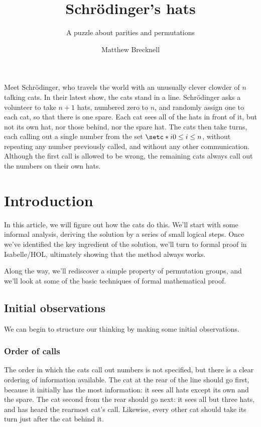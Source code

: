 \documentclass[10pt,a4paper]{scrartcl}
\title{Schr\"odinger's hats}
\subtitle{A puzzle about parities and permutations}
\author{Matthew Brecknell}
\begin{document}
\maketitle

Meet Schr\"odinger, who travels the world with an unusually clever clowder of
$n$ talking cats. In their latest show, the cats stand in a line.
Schr\"odinger asks a volunteer to take $n+1$ hats, numbered zero to $n$, and
randomly assign one to each cat, so that there is one spare. Each cat sees all
of the hats in front of it, but not its own hat, nor those behind, nor the
spare hat. The cats then take turns, each calling out a single number from the
set $\setc*{i}{0 \leq i \leq n}$, without repeating any number previously
called, and without any other communication. Although the first call is allowed
to be wrong, the remaining cats always call out the numbers on their own hats.

\section{Introduction}

In this article, we will figure out how the cats do this. We'll start with some
informal analysis, deriving the solution by a series of small logical steps.
Once we've identified the key ingredient of the solution, we'll turn to formal
proof in Isabelle/HOL, ultimately showing that the method always works.

Along the way, we'll rediscover a simple property of permutation groups, and
we'll look at some of the basic techniques of formal mathematical proof.

\subsection{Initial observations}

We can begin to structure our thinking by making some initial observations.

\subsubsection{Order of calls}

The order in which the cats call out numbers is not specified, but there is a
clear ordering of information available. The cat at the rear of the line should
go first, because it initially has the most information: it sees all hats
except its own and the spare. The cat second from the rear should go next: it
sees all but three hats, and has heard the rearmost cat's call. Likewise, every
other cat should take its turn just after the cat behind it.
\end{document}
